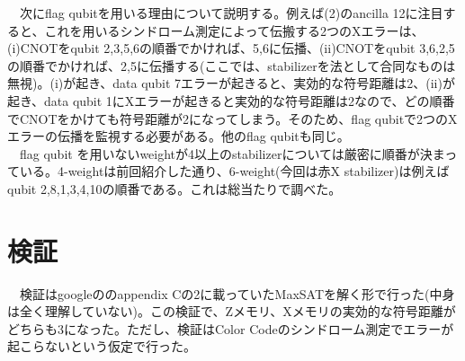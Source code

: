 \documentclass[a4paper,10pt]{ltjsarticle}
\begin{document}
{    　次にflag qubitを用いる理由について説明する。例えば(2)のancilla 12に注目すると、これを用いるシンドローム測定によって伝搬する2つのXエラーは、(i)CNOTをqubit 2,3,5,6の順番でかければ、5,6に伝播、(ii)CNOTをqubit 3,6,2,5の順番でかければ、2,5に伝播する(ここでは、stabilizerを法として合同なものは無視)。(i)が起き、data qubit 7エラーが起きると、実効的な符号距離は2、(ii)が起き、data qubit 1にXエラーが起きると実効的な符号距離は2なので、どの順番でCNOTをかけても符号距離が2になってしまう。そのため、flag qubitで2つのXエラーの伝播を監視する必要がある。他のflag qubitも同じ。\\
    　flag qubit を用いないweightが4以上のstabilizerについては厳密に順番が決まっている。4-weightは前回紹介した通り、6-weight(今回は赤X stabilizer)は例えばqubit 2,8,1,3,4,10の順番である。これは総当たりで調べた。
}

\section{検証}{
    　検証はgoogleの\cite{lacroix2024}のappendix Cの2に載っていたMaxSATを解く形で行った(中身は全く理解していない)。この検証で、Zメモリ、Xメモリの実効的な符号距離がどちらも3になった。ただし、検証はColor Codeのシンドローム測定でエラーが起こらないという仮定で行った。
}

\printbibliography
\end{document}
